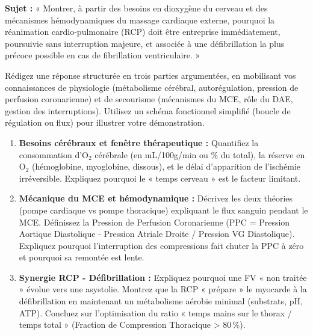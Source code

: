 \documentclass[11pt]{article}
\begin{document}
\begin{exercice}
\textbf{Sujet :} « Montrer, à partir des besoins en dioxygène du cerveau et des mécanismes hémodynamiques du massage cardiaque externe, pourquoi la réanimation cardio-pulmonaire (RCP) doit être entreprise immédiatement, poursuivie sans interruption majeure, et associée à une défibrillation la plus précoce possible en cas de fibrillation ventriculaire. »

Rédigez une réponse structurée en trois parties argumentées, en mobilisant vos connaissances de physiologie (métabolisme cérébral, autorégulation, pression de perfusion coronarienne) et de secourisme (mécanismes du MCE, rôle du DAE, gestion des interruptions). Utilisez un schéma fonctionnel simplifié (boucle de régulation ou flux) pour illustrer votre démonstration.
\begin{enumerate}
    \item \textbf{Besoins cérébraux et fenêtre thérapeutique :} Quantifiez la consommation d'O$_2$ cérébrale (en mL/100g/min ou \% du total), la réserve en O$_2$ (hémoglobine, myoglobine, dissous), et le délai d'apparition de l'ischémie irréversible. Expliquez pourquoi le « temps cerveau » est le facteur limitant.
    \item \textbf{Mécanique du MCE et hémodynamique :} Décrivez les deux théories (pompe cardiaque vs pompe thoracique) expliquant le flux sanguin pendant le MCE. Définissez la Pression de Perfusion Coronarienne (PPC = Pression Aortique Diastolique - Pression Atriale Droite / Pression VG Diastolique). Expliquez pourquoi l'interruption des compressions fait chuter la PPC à zéro et pourquoi sa remontée est lente.
    \item \textbf{Synergie RCP - Défibrillation :} Expliquez pourquoi une FV « non traitée » évolue vers une asystolie. Montrez que la RCP « prépare » le myocarde à la défibrillation en maintenant un métabolisme aérobie minimal (substrats, pH, ATP). Concluez sur l'optimisation du ratio « temps mains sur le thorax / temps total » (Fraction de Compression Thoracique > 80\,\%).
\end{enumerate}
\end{exercice}
\end{document}
